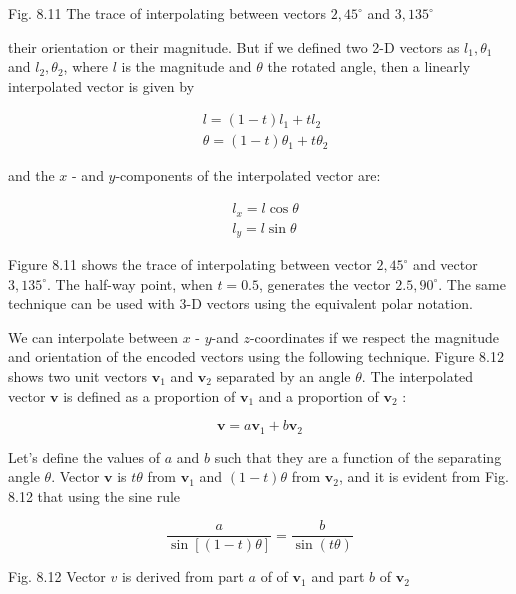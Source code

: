 \documentclass[10pt]{article}
\begin{document}
Fig. 8.11 The trace of interpolating between vectors $2,45^{\circ}$ and $3,135^{\circ}$

their orientation or their magnitude. But if we defined two 2-D vectors as $l_{1}, \theta_{1}$ and $l_{2}, \theta_{2}$, where $l$ is the magnitude and $\theta$ the rotated angle, then a linearly interpolated vector is given by

$$
\begin{aligned}
& l=(1-t) l_{1}+t l_{2} \\
& \theta=(1-t) \theta_{1}+t \theta_{2}
\end{aligned}
$$

and the $x$ - and $y$-components of the interpolated vector are:

$$
\begin{aligned}
& l_{x}=l \cos \theta \\
& l_{y}=l \sin \theta
\end{aligned}
$$

Figure 8.11 shows the trace of interpolating between vector $2,45^{\circ}$ and vector $3,135^{\circ}$. The half-way point, when $t=0.5$, generates the vector $2.5,90^{\circ}$. The same technique can be used with 3-D vectors using the equivalent polar notation.

We can interpolate between $x$ - $y$-and $z$-coordinates if we respect the magnitude and orientation of the encoded vectors using the following technique. Figure 8.12 shows two unit vectors $\mathbf{v}_{1}$ and $\mathbf{v}_{2}$ separated by an angle $\theta$. The interpolated vector $\mathbf{v}$ is defined as a proportion of $\mathbf{v}_{1}$ and a proportion of $\mathbf{v}_{2}$ :

$$
\mathbf{v}=a \mathbf{v}_{1}+b \mathbf{v}_{2}
$$

Let's define the values of $a$ and $b$ such that they are a function of the separating angle $\theta$. Vector $\mathbf{v}$ is $t \theta$ from $\mathbf{v}_{1}$ and $(1-t) \theta$ from $\mathbf{v}_{2}$, and it is evident from Fig. 8.12 that using the sine rule

$$
\frac{a}{\sin [(1-t) \theta]}=\frac{b}{\sin (t \theta)}
$$

Fig. 8.12 Vector $v$ is derived from part $a$ of of $\mathbf{v}_{1}$ and part $b$ of $\mathbf{v}_{2}$
\end{document}
